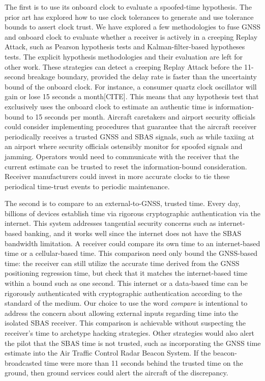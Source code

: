 \documentclass[letterpaper,times]{IONconf/IONconf}
\begin{document}
The first is to use its onboard clock to evaluate a spoofed-time hypothesis.
The prior art has explored how to use clock tolerances to generate and use tolerance bounds to assert clock trust\cite{time_sync_paper}.
We have explored a few methodologies to fuse GNSS and onboard clock to evaluate whether a receiver is actively in a creeping Replay Attack, such as Pearson hypothesis tests and Kalman-filter-based hypotheses tests.
The explicit hypothesis methodologies and their evaluation are left for other work.
These strategies can detect a creeping Replay Attack before the 11-second breakage boundary, provided the delay rate is faster than the uncertainty bound of the onboard clock.
For instance, a consumer quartz clock oscillator will gain or lose 15 seconds a month[CITE].
This means that any hypothesis test that exclusively uses the onboard clock to estimate an authentic time is information-bound to 15 seconds per month.
Aircraft caretakers and airport security officials could consider implementing procedures that guarantee that the aircraft receiver periodically receives a trusted GNSS and SBAS signals, such as while taxiing at an airport where security officials ostensibly monitor for spoofed signals and jamming.
Operators would need to communicate with the receiver that the current estimate can be trusted to reset the information-bound consideration.
Receiver manufacturers could invest in more accurate clocks to tie these periodical time-trust events to periodic maintenance.

The second is to compare to an external-to-GNSS, trusted time.
Every day, billions of devices establish time via rigorous cryptographic authentication via the internet.
This system addresses tangential security concerns such as internet-based banking, and it works well since the internet does not have the SBAS bandwidth limitation.
A receiver could compare its own time to an internet-based time or a cellular-based time.
This comparison need only bound the GNSS-based time: the receiver can still utilize the accurate time derived from the GNSS positioning regression time, but check that it matches the internet-based time within a bound such as one second.
This internet or a data-based time can be rigorously authenticated with cryptographic authentication according to the standard of the medium.
Our choice to use the word {\em compare} is intentional to address the concern about allowing external inputs regarding time into the isolated SBAS receiver.
This comparison is achievable without suspecting the receiver's time to archetype hacking strategies.
Other strategies would also alert the pilot that the SBAS time is not trusted, such as incorporating the GNSS time estimate into the Air Traffic Control Radar Beacon System.
If the beacon-broadcasted time were more than 11 seconds behind the trusted time on the ground, then ground services could alert the aircraft of the discrepancy.
\end{document}
